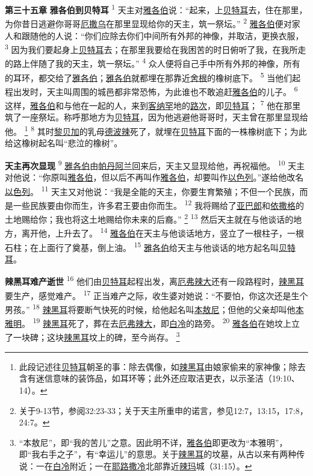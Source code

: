 \textbf{第三十五章 }
\textbf{雅各伯到贝特耳 }
\textsuperscript{1}
天主对\uline{雅各伯}说：“起来，上\uline{贝特耳}去，住在那里，为你昔日逃避你哥哥\uline{厄撒乌}在那里显现给你的天主，筑一祭坛。”
\textsuperscript{2}
\uline{雅各伯}便对家人和跟随他的人说：“你们应除去你们中间所有外邦的神像，并取洁，更换衣服，
\textsuperscript{3}
因为我们要起身上\uline{贝特耳}去；在那里我要给在我困苦的时日俯听了我，在我所走的路上伴随了我的天主，筑一祭坛。”
\textsuperscript{4}
众人便将自己手中所有外邦的神像，所有的耳环，都交给了\uline{雅各伯}；\uline{雅各伯}就都埋在那靠近\uline{舍根}的橡树底下。
\textsuperscript{5}
当他们起程出发时，天主叫周围的城邑都非常恐怖，为此谁也不敢追赶\uline{雅各伯}的儿子。
\textsuperscript{6}
这样，\uline{雅各伯}和与他在一起的人，来到\uline{客纳罕}地的\uline{路次}，即\uline{贝特耳}；
\textsuperscript{7}
他在那里筑了一座祭坛。称呼那地方为\uline{贝特耳}，因为他逃避他哥哥时，天主曾在那里显现给他。
\footnote{此段记述往\uline{贝特耳}朝圣的事：除去偶像，如\uline{辣黑耳}由娘家偷来的家神像；除去含有迷信意味的装饰品，如耳环等；此外还应取洁更衣，以示圣洁（19:10、14）。}
\textsuperscript{8}
其时\uline{黎贝加}的乳母\uline{德波辣}死了，就埋在\uline{贝特耳}下面的一株橡树底下；为此给这橡树起名叫“悲泣的橡树”。

\textbf{天主再次显现 }
\textsuperscript{9}
\uline{雅各伯}由\uline{帕丹阿兰}回来后，天主又显现给他，再祝福他。
\textsuperscript{10}
天主对他说：“你原叫\uline{雅各伯}，但以后不再叫作\uline{雅各伯}，却要叫作\uline{以色列}。”遂给他改名\uline{以色列}。
\textsuperscript{11}
天主又对他说：“我是全能的天主，你要生育繁殖；不但一个民族，而是一些民族要由你而生，许多君王要由你而生。
\textsuperscript{12}
我将赐给了\uline{亚巴郎}和\uline{依撒格}的土地赐给你；我也将这土地赐给你未来的后裔。”
\footnote{关于9-13节，参阅32:23-33；关于天主所重申的诺言，参见12:7，13:15，17:8，24:7。}
\textsuperscript{13}
然后天主就在与他谈话的地方，离开他，上升去了。
\textsuperscript{14}
\uline{雅各伯}在天主与他谈话地方，竖立了一根柱子，一根石柱；在上面行了奠基，倒上油。
\textsuperscript{15}
\uline{雅各伯}给天主与他谈话的地方起名叫\uline{贝特耳}。

\textbf{辣黑耳难产逝世 }
\textsuperscript{16}
他们由\uline{贝特耳}起程出发，离\uline{厄弗}\uline{辣大}还有一段路程时，\uline{辣黑耳}要生产，感觉难产。
\textsuperscript{17}
正当难产之际，收生婆对她说：“不要怕，你这次还是生个男孩。”
\textsuperscript{18}
\uline{辣黑耳}将要断气快死的时候，给他起名叫\uline{本敖尼}；但他的父亲却叫他\uline{本雅明}。
\textsuperscript{19}
\uline{辣黑耳}死了，葬在去\uline{厄弗}\uline{辣大}，即\uline{白冷}的路旁。
\textsuperscript{20}
\uline{雅各伯}在她坟上立了一块碑；这块\uline{辣黑耳}坟上的碑，至今尚存。
\footnote{“本敖尼”，即“我的苦儿”之意。因此明不详，\uline{雅各伯}即更改为“本雅明”，即“我右手之子”，有“幸运儿”的意思。关于\uline{辣黑耳}的坟墓，从古以来有两种传说：一在\uline{白冷}附近；一在\uline{耶路撒冷}北部靠近\uline{辣玛}城（31:15）。}

